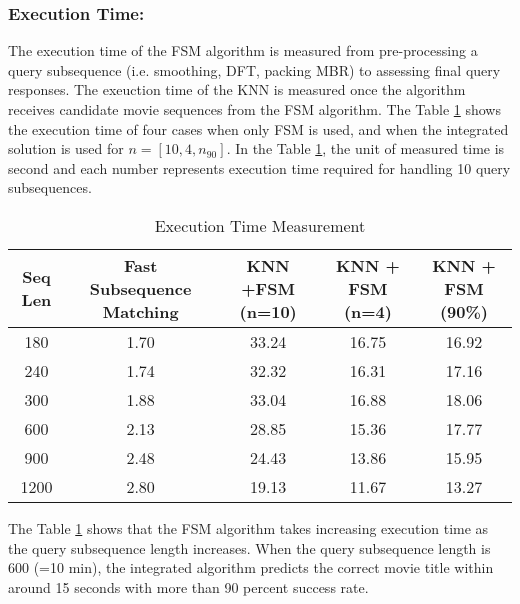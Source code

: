 \subsubsection{Execution Time:} The execution time of the FSM algorithm is measured from pre-processing a query subsequence (i.e. smoothing, DFT, packing MBR) to assessing final query responses. The exeuction time of the KNN is measured once the algorithm receives candidate movie sequences from the FSM algorithm. The Table \ref{tab:exec_table} shows the execution time of four cases when only FSM is used, and when the integrated solution is used for $n = [10, 4, n_{90}]$. In the Table \ref{tab:exec_table}, the unit of measured time is second and each number represents execution time required for handling 10 query subsequences.

\begin{table}[h!]
\begin{center}
\begin{tabular}{|c|| c| c| c| c| }
\hline
Seq Len & Fast Subsequence Matching & KNN +FSM (n=10) & KNN + FSM (n=4) & KNN + FSM (90\%)
\tabularnewline
\hline
180 & 1.70 & 33.24 & 16.75 & 16.92
\tabularnewline
240 & 1.74 & 32.32 & 16.31 & 17.16 
\tabularnewline
300 & 1.88 & 33.04 & 16.88 & 18.06 
\tabularnewline
600 & 2.13 & 28.85 & 15.36 & 17.77
\tabularnewline
900 & 2.48 & 24.43 & 13.86 & 15.95
\tabularnewline
1200 & 2.80 & 19.13 & 11.67 & 13.27
\tabularnewline
\hline
\end{tabular}
\end{center}
\caption{Execution Time Measurement}
\label{tab:exec_table}
\end{table}

The Table \ref{tab:exec_table} shows that the FSM algorithm takes increasing execution time as the query subsequence length increases. When the query subsequence length is 600 (=10 min), the integrated algorithm predicts the correct movie title within around 15 seconds with more than 90 percent success rate. 